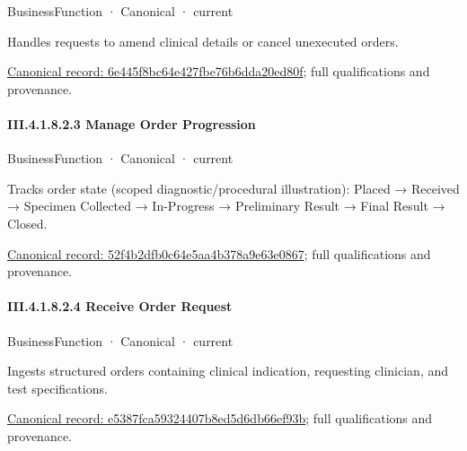 \label{element:6e445f8bc64e427fbe76b6dda20ed80f}
{\small BusinessFunction · Canonical · current}\par

Handles requests to amend clinical details or cancel unexecuted orders.


{\footnotesize \href{../../../../continuum/business/business-function/6e445f8bc64e427fbe76b6dda20ed80f.md}{Canonical record: 6e445f8bc64e427fbe76b6dda20ed80f}; full qualifications and provenance.}\par
\paragraph*{III.4.1.8.2.3 Manage Order Progression}
\label{navigation:III.4.1.8.2.3}

\label{element:52f4b2dfb0c64e5aa4b378a9e63e0867}
{\small BusinessFunction · Canonical · current}\par

Tracks order state (scoped diagnostic/procedural illustration): Placed → Received → Specimen Collected → In-Progress → Preliminary Result → Final Result → Closed.


{\footnotesize \href{../../../../continuum/business/business-function/52f4b2dfb0c64e5aa4b378a9e63e0867.md}{Canonical record: 52f4b2dfb0c64e5aa4b378a9e63e0867}; full qualifications and provenance.}\par
\paragraph*{III.4.1.8.2.4 Receive Order Request}
\label{navigation:III.4.1.8.2.4}

\label{element:e5387fca59324407b8ed5d6db66ef93b}
{\small BusinessFunction · Canonical · current}\par

Ingests structured orders containing clinical indication, requesting clinician, and test specifications.


{\footnotesize \href{../../../../continuum/business/business-function/e5387fca59324407b8ed5d6db66ef93b.md}{Canonical record: e5387fca59324407b8ed5d6db66ef93b}; full qualifications and provenance.}\par
